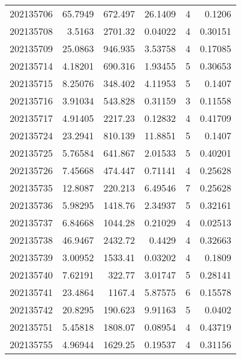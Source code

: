 \begin{tabular}{rrrrrr}
 202135706 &         65.7949  &      672.497  &           26.1409  &           4 & 0.1206  \\
 202135708 &          3.5163  &     2701.32   &            0.04022 &           4 & 0.30151 \\
 202135709 &         25.0863  &      946.935  &            3.53758 &           4 & 0.17085 \\
 202135714 &          4.18201 &      690.316  &            1.93455 &           5 & 0.30653 \\
 202135715 &          8.25076 &      348.402  &            4.11953 &           5 & 0.1407  \\
 202135716 &          3.91034 &      543.828  &            0.31159 &           3 & 0.11558 \\
 202135717 &          4.91405 &     2217.23   &            0.12832 &           4 & 0.41709 \\
 202135724 &         23.2941  &      810.139  &           11.8851  &           5 & 0.1407  \\
 202135725 &          5.76584 &      641.867  &            2.01533 &           5 & 0.40201 \\
 202135726 &          7.45668 &      474.447  &            0.71141 &           4 & 0.25628 \\
 202135735 &         12.8087  &      220.213  &            6.49546 &           7 & 0.25628 \\
 202135736 &          5.98295 &     1418.76   &            2.34937 &           5 & 0.32161 \\
 202135737 &          6.84668 &     1044.28   &            0.21029 &           4 & 0.02513 \\
 202135738 &         46.9467  &     2432.72   &            0.4429  &           4 & 0.32663 \\
 202135739 &          3.00952 &     1533.41   &            0.03202 &           4 & 0.1809  \\
 202135740 &          7.62191 &      322.77   &            3.01747 &           5 & 0.28141 \\
 202135741 &         23.4864  &     1167.4    &            5.87575 &           6 & 0.15578 \\
 202135742 &         20.8295  &      190.623  &            9.91163 &           5 & 0.0402  \\
 202135751 &          5.45818 &     1808.07   &            0.08954 &           4 & 0.43719 \\
 202135755 &          4.96944 &     1629.25   &            0.19537 &           4 & 0.31156 \\

\end{tabular}
